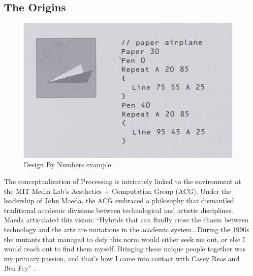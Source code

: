 
\subsection{The Origins}
\begin{figure}
    \includegraphics[max width=\textwidth]{images/dbn.png} 
    \caption[Design By Numbers example]{Design By Numbers example \parencite[66]{maedaDesignNumbers2001}}
    \label{fig:dbn}
  \end{figure}


 

The conceptualization of Processing is intricately linked to the environment at the MIT Media Lab's Aesthetics + Computation Group (ACG). Under the leadership of John Maeda, the ACG embraced a philosophy that dismantled traditional academic divisions between technological and artistic disciplines. Maeda articulated this vision: \enquote{Hybrids that can fluidly cross the chasm between technology and the arts are mutations in the academic system...During the 1990s the mutants that managed to defy this norm would either seek me out, or else I would reach out to find them myself. Bringing these unique people together was my primary passion, and that’s how I came into contact with Casey Reas and Ben Fry} \parencite{reasProcessingProgrammingHandbook2007a}.

